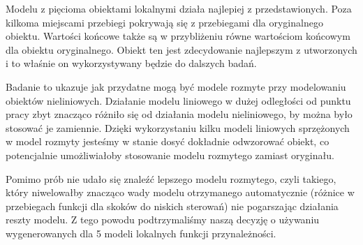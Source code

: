		Modelu z pięcioma obiektami lokalnymi działa najlepiej z przedstawionych. Poza kilkoma miejscami przebiegi pokrywają się z przebiegami dla oryginalnego obiektu. Wartości końcowe także są w przybliżeniu równe wartościom końcowym dla obiektu oryginalnego. Obiekt ten jest zdecydowanie najlepszym z utworzonych i to właśnie on wykorzystywany będzie do dalszych badań.
		
		Badanie to ukazuje jak przydatne mogą być modele rozmyte przy modelowaniu obiektów nieliniowych. Działanie modelu liniowego w dużej odległości od punktu pracy zbyt znacząco różniło się od działania modelu nieliniowego, by można było stosować je zamiennie. Dzięki wykorzystaniu kilku modeli liniowych sprzężonych w model rozmyty jesteśmy w stanie dosyć dokładnie odwzorować obiekt, co potencjalnie umożliwiałoby stosowanie modelu rozmytego zamiast oryginału.
		
		Pomimo prób nie udało się znaleźć lepszego modelu rozmytego, czyli takiego, który niwelowałby znacząco wady modelu otrzymanego automatycznie (różnice w przebiegach funkcji dla skoków do niskich sterowań) nie pogarszając działania reszty modelu. Z tego powodu podtrzymaliśmy naszą decyzję o używaniu wygenerowanych dla 5 modeli lokalnych funkcji przynależności.
		
